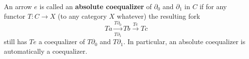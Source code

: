 An arrow $e$ is called an \textbf{absolute coequalizer} of $\partial_0$ and $\partial_1$ in $C$ if for any functor $T: C \to X$ (to any category $X$ whatever) the resulting fork
$$Ta \xrightarrow[T\partial_1]{T\partial_0} Tb \xrightarrow{Te} Tc$$
still has $Te$ a coequalizer of $T\partial_0$ and $T\partial_1$. In particular, an absolute coequalizer is automatically a coequalizer.
